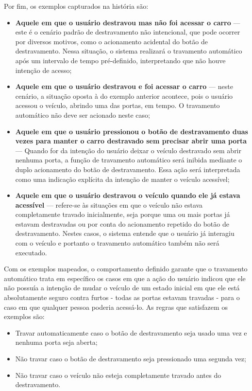 Por fim, os exemplos capturados na história são:

\begin{itemize}
    \item \textbf{Aquele em que o usuário destravou mas não foi acessar o carro} — este é o cenário padrão de destravamento não intencional, que pode ocorrer por diversos motivos, como o acionamento acidental do botão de destravamento. Nessa situação, o sistema realizará o travamento automático após um intervalo de tempo pré-definido, interpretando que não houve intenção de acesso;
    \item \textbf{Aquele em que o usuário destravou e foi acessar o carro} — neste cenário, a situação oposta à do exemplo anterior acontece, pois o usuário acessou o veículo, abrindo uma das portas, em tempo. O travamento automático não deve ser acionado neste caso;
    \item \textbf{Aquele em que o usuário pressionou o botão de destravamento duas vezes para manter o carro destravado sem precisar abrir uma porta} — Quando for da intenção do usuário deixar o veículo destravado sem abrir nenhuma porta, a função de travamento automático será inibida mediante o duplo acionamento do botão de destravamento. Essa ação será interpretada como uma indicação explícita da intenção de manter o veículo acessível;
    \item \textbf{Aquele em que o usuário destravou o veículo quando ele já estava acessível} — refere-se às situações em que o veículo não estava completamente travado inicialmente, seja porque uma ou mais portas já estavam destravadas ou por conta do acionamento repetido do botão de destravamento. Nestes casos, o sistema entende que o usuário já interagiu com o veículo e portanto o travamento automático também não será executado.
\end{itemize}

Com os exemplos mapeados, o comportamento definido garante que o travamento automático trata em específico os casos em que a ação do usuário indicou que ele não possuía a intenção de mudar o veículo de um estado inicial em que ele está absolutamente seguro contra furtos - todas as portas estavam travadas - para o caso em que qualquer pessoa poderia acessá-lo. As regras que satisfazem os exemplos são:

\begin{itemize}
    \item Travar automaticamente caso o botão de destravamento seja usado uma vez e nenhuma porta seja aberta;
    \item Não travar caso o botão de destravamento seja pressionado uma segunda vez;
    \item Não travar caso o veículo não esteja completamente travado antes do destravamento.
\end{itemize}

